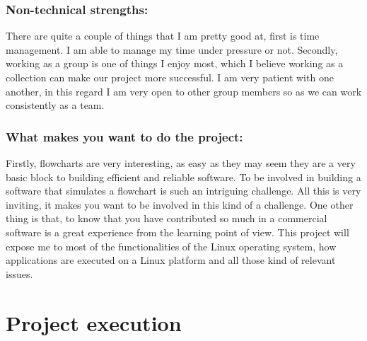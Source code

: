 \documentclass[12pt]{article}
\begin{document}
\begin{description}
	\subsubsection{Non-technical strengths:}
	
	There are quite a couple of things that I am pretty good at, first is time management. I am able to manage my time under pressure or not. Secondly, working as a group is one of things I enjoy most, which I believe working as a collection can make our project more successful. I am very patient with one another, in this regard I am very open to other group members so as we can work consistently as a team.
	
	\subsubsection{What makes you want to do the project:}
	
	Firstly, flowcharts are very interesting, as easy as they may seem they are a very basic block to building efficient and reliable software. To be involved in building a software that simulates a flowchart is such an intriguing challenge. All this is very inviting, it makes you want to be involved in this kind of a challenge. One other thing is that, to know that you have contributed so much in a commercial software is a great experience from the learning point of view. This project will expose me to most of the functionalities of the Linux operating system, how applications are executed on a Linux platform and all those kind of relevant issues.


\end{description}



\section{Project execution}
\end{document}
